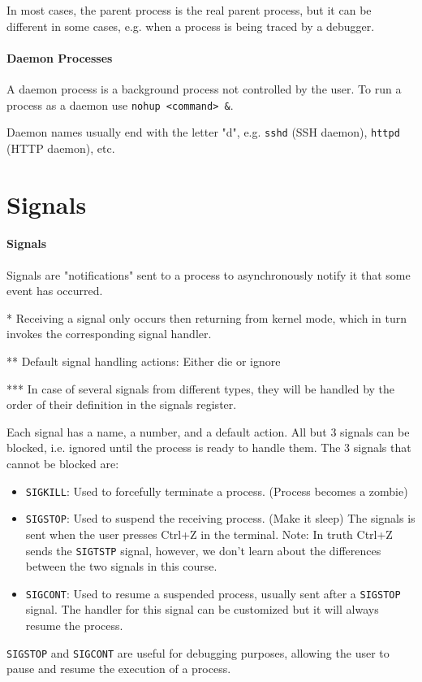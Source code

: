 \documentclass[openany,12pt]{book}
\newcommand{\code}[1]{\texttt{#1}}
\begin{document}
In most cases, the parent process is the real parent process, but it can be different in some cases, e.g. when a process is being traced by a debugger.



\paragraph{Daemon Processes}
A daemon process is a background process not controlled by the user.
To run a process as a daemon use \code{nohup <command> \&}.

Daemon names usually end with the letter "d", e.g. \texttt{sshd} (SSH daemon), \texttt{httpd} (HTTP daemon), etc.




\newpage
\section*{Signals}
\paragraph{Signals}
Signals are "notifications" sent to a process to asynchronously notify it that some event has occurred.

* Receiving a signal only occurs then returning from kernel mode, which in turn invokes the corresponding signal handler.

** Default signal handling actions: Either die or ignore

*** In case of several signals from different types, they will be handled by the order of their definition in the signals register.


\vspace{1em}

Each signal has a name, a number, and a default action. All but 3 signals can be blocked, i.e. ignored until the process is ready to handle them. The 3 signals that cannot be blocked are:
\begin{itemize}
    \item \texttt{SIGKILL}: Used to forcefully terminate a process. (Process becomes a zombie)
    \item \texttt{SIGSTOP}: Used to suspend the receiving process. (Make it sleep) The signals is sent when the user presses Ctrl+Z in the terminal. {\color{gray}Note: In truth Ctrl+Z sends the \texttt{SIGTSTP} signal, however, we don't learn about the differences between the two signals in this course.}
    \item \texttt{SIGCONT}: Used to resume a suspended process, usually sent after a \texttt{SIGSTOP} signal. The handler for this signal can be customized but it {\color{red}will always} resume the process.
\end{itemize}
\texttt{SIGSTOP} and \texttt{SIGCONT} are useful for debugging purposes, allowing the user to pause and resume the execution of a process.
\end{document}
